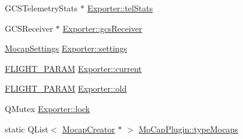 \begin{DoxyCompactItemize}
\item 
\-G\-C\-S\-Telemetry\-Stats $\ast$ \hyperlink{group___mo_cap_plugin_gad3a5a6122f88f8f4b44847053a7d830b}{\-Exporter\-::tel\-Stats}
\item 
\-G\-C\-S\-Receiver $\ast$ \hyperlink{group___mo_cap_plugin_ga49b2f0b0762b95f0da3f7c4a7330b941}{\-Exporter\-::gcs\-Receiver}
\item 
\hyperlink{group___mo_cap_plugin_ga6083347a5b3eb70e360f599354dc0f0b}{\-Mocap\-Settings} \hyperlink{group___mo_cap_plugin_ga50484fe9f9410948c133b1c589f73f76}{\-Exporter\-::settings}
\item 
\hyperlink{group___h_i_t_l_plugin_ga7bda7a22b899fe8dff0ba9a0cae99da6}{\-F\-L\-I\-G\-H\-T\-\_\-\-P\-A\-R\-A\-M} \hyperlink{group___mo_cap_plugin_ga6c17ed61598da30f012113ffbff26816}{\-Exporter\-::current}
\item 
\hyperlink{group___h_i_t_l_plugin_ga7bda7a22b899fe8dff0ba9a0cae99da6}{\-F\-L\-I\-G\-H\-T\-\_\-\-P\-A\-R\-A\-M} \hyperlink{group___mo_cap_plugin_ga5ef84da1bd9cf4e1d625c33beb5a148c}{\-Exporter\-::old}
\item 
\-Q\-Mutex \hyperlink{group___mo_cap_plugin_ga55a5f9c6eb2d80cfc96523f4592f5417}{\-Exporter\-::lock}
\item 
static \-Q\-List$<$ \hyperlink{class_mocap_creator}{\-Mocap\-Creator} $\ast$ $>$ \hyperlink{group___mo_cap_plugin_gaca68fd324d804c3124d7ba64b5d0294a}{\-Mo\-Cap\-Plugin\-::type\-Mocaps}
\end{DoxyCompactItemize}
